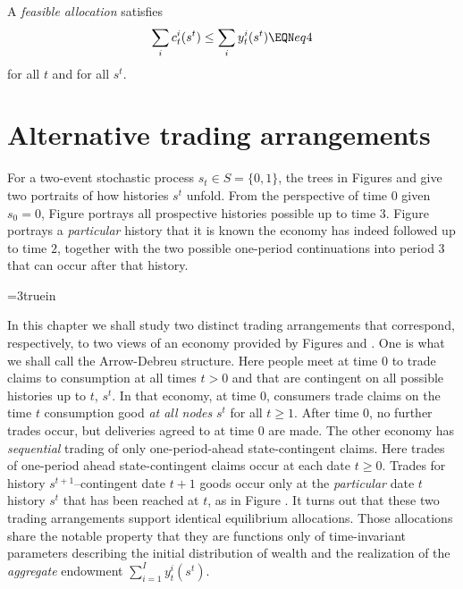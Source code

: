 
A {\it feasible allocation} satisfies
$$\sum_i c_t^i(s^t) \leq \sum_i y_t^i(s^t)  \EQN eq4 $$
for all $t$ and for all $s^t$.


\section{Alternative trading arrangements}
For a two-event stochastic process $s_t \in S = \{0, 1\}$, the
trees in Figures  and  %
 give
two portraits of how histories $s^t$ unfold.  From the
perspective of time $0$ given $s_0=0$, Figure  portrays
all prospective histories possible up to time
$3$. Figure  portrays  a {\it particular\/} history that it is
known the economy has indeed followed up to   time $2$, together
with the  two possible one-period continuations into period $3$
that can occur after that history.


\centerline{\epsfxsize=3truein} \caption{The
Arrow-Debreu commodity space for a two-state Markov chain. At time
$0$, there are trades in time $t=3$ goods for each of the eight
nodes that signify histories that can possibly be reached starting from
the node at time $0$.} 
\endfigure



In this chapter we shall study two distinct trading arrangements
that correspond, respectively,  to  two views of an economy provided by
Figures  and . %
One is
what we shall call the Arrow-Debreu structure.  Here  people meet
at time $0$ to  trade claims to consumption at all times $t >0$
and that are contingent on all possible histories up to $t$,
$s^t$. In that economy, at time $0$, consumers trade claims on
the time $t$ consumption good {\it at all nodes\/} $s^t$   for all $t \geq 1$. After
time $0$, no further trades occur, but deliveries agreed to at time $0$ are made.
     The other economy has {\it sequential\/} trading of
only one-period-ahead state-contingent claims. Here trades of one-period ahead state-contingent claims occur
at each date $t \geq 0$.   Trades for history
$s^{t+1}$--contingent date $t+1$ goods occur only at the {\it
particular\/}   date $t$ history $s^t$ that has been reached at
$t$, as in Figure .   %
 It turns out that  these two trading
arrangements support identical equilibrium allocations. Those
allocations share the notable property that they are  functions only of   time-invariant
parameters describing the initial distribution of wealth and  the realization of
the {\it aggregate\/} endowment $\sum_{i=1}^I y_t^i(s^t)$.






